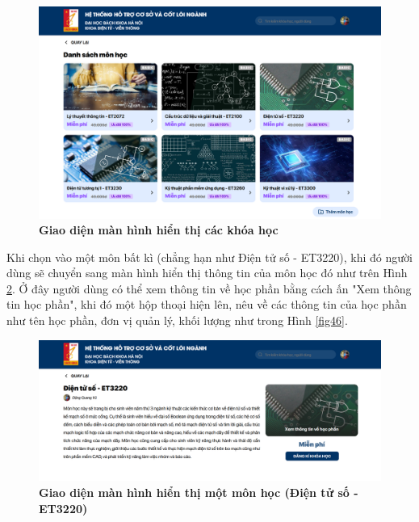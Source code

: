 \documentclass{article}
\begin{document}
	 \begin{figure}[!ht]
	 	\centering
	 	\includegraphics[trim= 10pt 10pt 10pt 10pt, clip, width=14cm]{localhost_3000_courses.png}
	 	\caption [Giao diện màn hình hiển thị các khóa học]{\bfseries \fontsize{12pt}{0pt}\selectfont Giao diện màn hình hiển thị các khóa học}
	 	\label{fig44}
	 \end{figure}
	 
	 Khi chọn vào một môn bất kì (chẳng hạn như Điện tử số - ET3220), khi đó người dùng sẽ chuyển sang màn hình hiển thị thông tin của môn học đó như trên Hình \ref{fig45}. Ở đây người dùng có thể xem thông tin về học phần bằng cách ấn "Xem thông tin học phần", khi đó một hộp thoại hiện lên, nêu về các thông tin của học phần như tên học phần, đơn vị quản lý, khối lượng như trong Hình \ref{fig46}.
	 
	 \begin{figure}[!ht]
	 	\centering
	 	\includegraphics[trim= 10pt 10pt 10pt 10pt, clip, width=14cm]{localhost_3000_courses_ET3220.png}
	 	\caption [Giao diện màn hình hiển thị một môn học (Điện tử số - ET3220)]{\bfseries \fontsize{12pt}{0pt}\selectfont Giao diện màn hình hiển thị một môn học (Điện tử số - ET3220)}
	 	\label{fig45}
	 \end{figure}
	 
\end{document}
